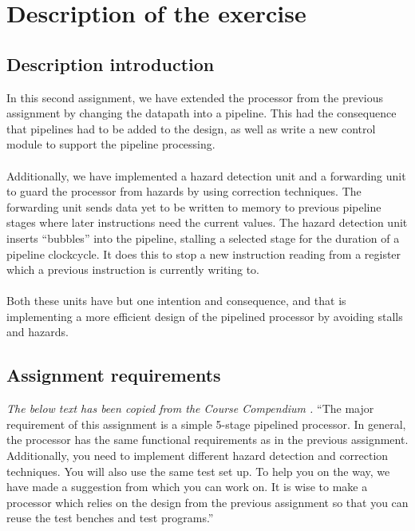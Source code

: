 \section{Description of the exercise}

\subsection{Description introduction}

In this second assignment, we have extended the processor from the previous
assignment by changing the datapath into a pipeline. This had the consequence
that pipelines had to be added to the design, as well as write a new control
module to support the pipeline processing.
\paragraph*{}
Additionally, we have
implemented a hazard detection unit and a forwarding unit to guard the
processor from hazards by using correction techniques. The forwarding unit
sends data yet to be written to memory to previous pipeline stages where later
instructions need the current values. The hazard detection unit inserts
``bubbles'' into the pipeline, stalling a selected stage for the duration of a
pipeline clockcycle. It does this to stop a new instruction reading from a
register which a previous instruction is currently writing to.
\paragraph*{}
Both these units have but one intention and consequence, and that is
implementing a more efficient design of the pipelined processor by avoiding
stalls and hazards.

\subsection{Assignment requirements}
\emph{The below text has been copied from the Course Compendium
\cite{compendium}.}\newline
``The major requirement of this assignment is a simple 5-stage pipelined
processor. In general, the processor has the same functional requirements as in
the previous assignment. Additionally, you need to implement diﬀerent hazard
detection and correction techniques. You will also use the same test set up. To
help you on the way, we have made a suggestion from which you can work on. It is
wise to make a processor which relies on the design from the previous assignment
so that you can reuse the test benches and test programs.''

